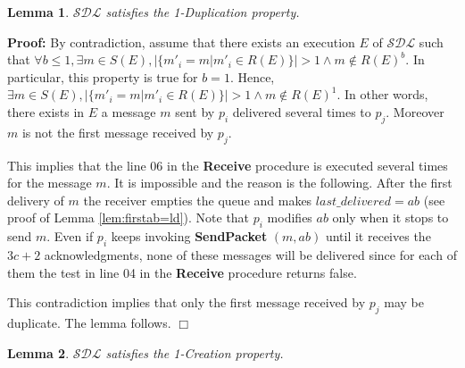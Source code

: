 \documentclass[11pt]{article}
\newtheorem{lemma}{Lemma}
\newenvironment{proof}{\noindent\textbf{Proof:}}{\hfill$\Box$}
\begin{document}
\begin{lemma}\label{lem:duplication}
$\mathcal{SDL}$ satisfies the 1-Duplication property.
\end{lemma}

\begin{proof}
By contradiction, assume that there exists an execution $E$ of $\mathcal{SDL}$ such that $\forall b\leq 1, \exists m\in S(E),\big|\{m'_i=m|m'_i\in R(E)\}\big|>1 \wedge m\notin R(E)^b$. In particular, this property is true for $b=1$. Hence, $\exists m\in S(E), \big|\{m'_i=m|m'_i\in R(E)\}\big|>1 \wedge m\notin R(E)^1$. In other words, there exists in $E$ a message $m$ sent by $p_i$ delivered several times to $p_j$. Moreover $m$ is not the first message received by $p_j$.

This implies that the line 06 in the \textbf{Receive} procedure is executed several times for the message $m$. It is impossible and the reason is the following. After the first delivery of $m$ the receiver empties the queue and makes $last\_delivered=ab$ (see proof of Lemma \ref{lem:firstab=ld}). Note that $p_i$ modifies $ab$ only when it stops to send $m$. Even if $p_i$ keeps invoking \textbf{SendPacket} $(m,ab)$ until it receives the $3c+2$ acknowledgments, none of these messages will be delivered since for each of them the test in line 04 in the \textbf{Receive} procedure returns false.

This contradiction implies that only the first message received by $p_j$ may be duplicate. The lemma follows. 
\end{proof}

\begin{lemma}\label{lem:creation}
$\mathcal{SDL}$ satisfies the 1-Creation property.
\end{lemma}
\end{document}

